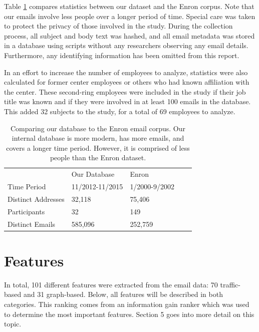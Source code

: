 \documentclass{article}
\begin{document}
Table \ref{tab:db_stats} compares statistics between our dataset and the Enron corpus.  Note that our emails involve less people over a longer period of time.  
Special care was taken to protect the privacy of those involved in the study.  During the collection process, all subject and body text was hashed, and all email  metadata was stored in a database using scripts without any researchers observing any email details. Furthermore, any identifying information has been omitted from this report.
\par
In an effort to increase the number of employees to analyze, statistics were also calculated for former center employees or others who had known affiliation with the center.  These second-ring employees were included in the study if their job title was known and if they were involved in at least 100 emails in the database.  This added 32 subjects to the study, for a total of 69 employees to analyze.

\begin{table}[H]
\centering
\caption{Comparing our database to the Enron email corpus.  Our internal database is more modern, has more emails, and covers a longer time period.  However, it is comprised of less people than the Enron dataset.}
\label{tab:db_stats}
\begin{tabular}{l|l|l|ll}
\cline{2-3}
                                               & Our Database    & Enron         &  &  \\ \cline{1-3}
\multicolumn{1}{|l|}{Time Period}              & 11/2012-11/2015 & 1/2000-9/2002 &  &  \\
\multicolumn{1}{|l|}{Distinct Addresses} & 32,118          & 75,406        &  &  \\
\multicolumn{1}{|l|}{Participants}             & 32              & 149           &  &  \\
\multicolumn{1}{|l|}{Distinct Emails}          & 585,096         & 252,759       &  &  \\ \cline{1-3}
\end{tabular}
\end{table}

\section{Features} \label{Features}
In total, 101 different features were extracted from the email data: 70 traffic-based and 31 graph-based.  Below, all features will be described in both categories.  This ranking comes from an information gain ranker which was used to determine the most important features.  Section 5 goes into more detail on this topic.
\end{document}
